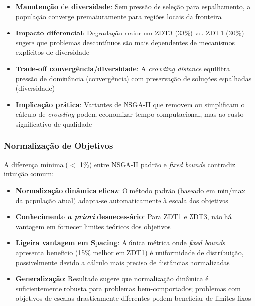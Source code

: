 \begin{itemize}
    \item \textbf{Manutenção de diversidade}: Sem pressão de seleção para espalhamento, a população converge prematuramente para regiões locais da fronteira
    
    \item \textbf{Impacto diferencial}: Degradação maior em ZDT3 (33\%) vs. ZDT1 (30\%) sugere que problemas descontínuos são mais dependentes de mecanismos explícitos de diversidade
    
    \item \textbf{Trade-off convergência/diversidade}: A \textit{crowding distance} equilibra pressão de dominância (convergência) com preservação de soluções espalhadas (diversidade)
    
    \item \textbf{Implicação prática}: Variantes de NSGA-II que removem ou simplificam o cálculo de \textit{crowding} podem economizar tempo computacional, mas ao custo significativo de qualidade
\end{itemize}

\subsubsection{Normalização de Objetivos}

A diferença mínima ($<$ 1\%) entre NSGA-II padrão e \textit{fixed bounds} contradiz intuição comum:

\begin{itemize}
    \item \textbf{Normalização dinâmica eficaz}: O método padrão (baseado em min/max da população atual) adapta-se automaticamente à escala dos objetivos
    
    \item \textbf{Conhecimento \textit{a priori} desnecessário}: Para ZDT1 e ZDT3, não há vantagem em fornecer limites teóricos dos objetivos
    
    \item \textbf{Ligeira vantagem em Spacing}: A única métrica onde \textit{fixed bounds} apresenta benefício (15\% melhor em ZDT1) é uniformidade de distribuição, possivelmente devido a cálculo mais preciso de distâncias normalizadas
    
    \item \textbf{Generalização}: Resultado sugere que normalização dinâmica é suficientemente robusta para problemas bem-comportados; problemas com objetivos de escalas drasticamente diferentes podem beneficiar de limites fixos
\end{itemize}

